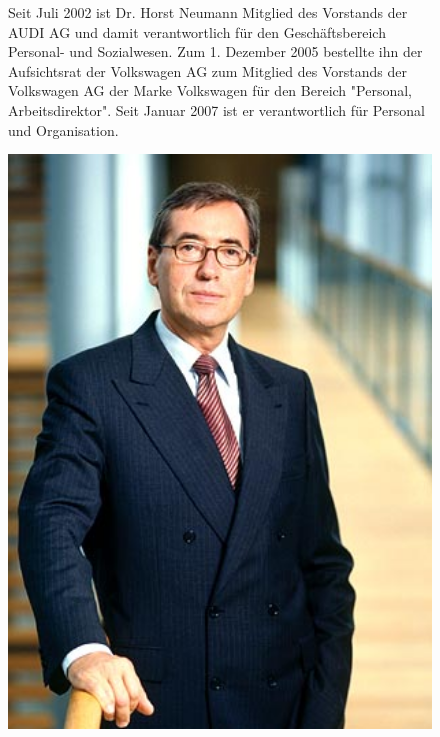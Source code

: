 \documentclass[12pt]{article}
\begin{document}
\begin{figure}[here!]
	\centering
	\begin{minipage}[h]{0.65\textwidth}
		Seit Juli 2002 ist Dr. Horst Neumann Mitglied des Vorstands der AUDI AG und damit verantwortlich für den Geschäftsbereich Personal- und Sozialwesen. Zum 1. Dezember 2005 bestellte ihn der Aufsichtsrat der Volkswagen AG zum Mitglied des Vorstands der Volkswagen AG  der Marke Volkswagen für den Bereich "Personal, Arbeitsdirektor". Seit Januar 2007 ist er verantwortlich für Personal und Organisation.
	\end{minipage}
	\begin{minipage}[h]{0.10\textwidth}
		\hspace{1cm} 
	\end{minipage}
	\begin{minipage}[h]{0.20\textwidth}
		\centering
		\includegraphics[width=1.0\textwidth]{images/HorstNeumann.jpg}
		\label{fig:vorstandvw5}
		\cite{hmpic}
	\end{minipage}
\end{figure}
\end{document}
